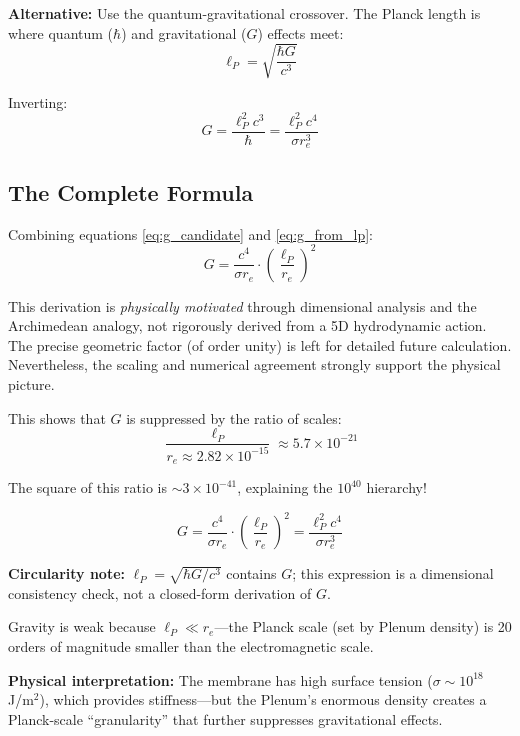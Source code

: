 \textbf{Alternative:} Use the quantum-gravitational crossover. The Planck length is where quantum ($\hbar$) and gravitational ($G$) effects meet:
\begin{equation}
\ell_P = \sqrt{\frac{\hbar G}{c^3}}
\end{equation}

Inverting:
\begin{equation}
G = \frac{\ell_P^2 c^3}{\hbar} = \frac{\ell_P^2 c^4}{\sigma r_e^3}
\label{eq:g_from_lp}
\end{equation}

\subsection{The Complete Formula}

Combining equations \eqref{eq:g_candidate} and \eqref{eq:g_from_lp}:
\begin{equation}
\boxed{G = \frac{c^4}{\sigma r_e} \cdot \left(\frac{\ell_P}{r_e}\right)^2}
\label{eq:g_final}
\end{equation}

\begin{tcolorbox}[colback=red!5,colframe=red!50!black,title=Important Caveat]
This derivation is \textit{physically motivated} through dimensional analysis and the Archimedean analogy, not rigorously derived from a 5D hydrodynamic action. The precise geometric factor (of order unity) is left for detailed future calculation. Nevertheless, the scaling and numerical agreement strongly support the physical picture.
\end{tcolorbox}

This shows that $G$ is suppressed by the ratio of scales:
\begin{equation}
\frac{\ell_P}{r_e \approx 2.82 \times 10^{-15}} \approx 5.7 \times 10^{-21}
\end{equation}

The square of this ratio is $\sim 3 \times 10^{-41}$, explaining the $10^{40}$ hierarchy!

\begin{tcolorbox}[colback=yellow!5,colframe=yellow!50!black,title=Dimensional Consistency Check: Newton's Constant {\normalfont[I]}]
\begin{equation*}
G = \frac{c^4}{\sigma r_e} \cdot \left(\frac{\ell_P}{r_e}\right)^2 = \frac{\ell_P^2 c^4}{\sigma r_e^3}
\end{equation*}

\textbf{Circularity note:} $\ell_P = \sqrt{\hbar G/c^3}$ contains $G$; this expression is a dimensional consistency check, not a closed-form derivation of $G$.

Gravity is weak because $\ell_P \ll r_e$—the Planck scale (set by Plenum density) is 20 orders of magnitude smaller than the electromagnetic scale.

\textbf{Physical interpretation:} The membrane has high surface tension ($\sigma \sim 10^{18}$ J/m$^2$), which provides stiffness—but the Plenum's enormous density creates a Planck-scale ``granularity'' that further suppresses gravitational effects.
\end{tcolorbox}

